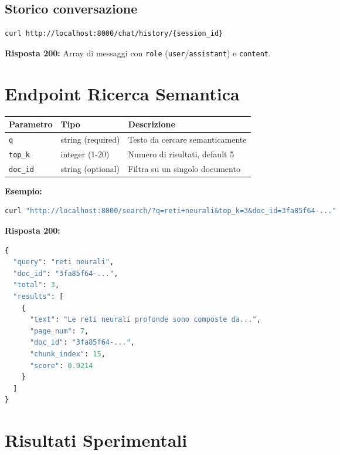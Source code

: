 \subsection{Storico conversazione}

\begin{lstlisting}[language=bash]
curl http://localhost:8000/chat/history/{session_id}
\end{lstlisting}

\textbf{Risposta 200:} Array di messaggi con \texttt{role} (\texttt{user}/\texttt{assistant})
e \texttt{content}.

\section{Endpoint Ricerca Semantica}

\begin{table}[H]
  \centering
  \begin{tabularx}{\textwidth}{llX}
    \toprule
    \textbf{Parametro} & \textbf{Tipo} & \textbf{Descrizione} \\
    \midrule
    \texttt{q}       & string (required) & Testo da cercare semanticamente \\
    \texttt{top\_k}  & integer (1-20)    & Numero di risultati, default 5 \\
    \texttt{doc\_id} & string (optional) & Filtra su un singolo documento \\
    \bottomrule
  \end{tabularx}
\end{table}

\textbf{Esempio:}
\begin{lstlisting}[language=bash]
curl "http://localhost:8000/search/?q=reti+neurali&top_k=3&doc_id=3fa85f64-..."
\end{lstlisting}

\textbf{Risposta 200:}
\begin{lstlisting}[language=Python]
{
  "query": "reti neurali",
  "doc_id": "3fa85f64-...",
  "total": 3,
  "results": [
    {
      "text": "Le reti neurali profonde sono composte da...",
      "page_num": 7,
      "doc_id": "3fa85f64-...",
      "chunk_index": 15,
      "score": 0.9214
    }
  ]
}
\end{lstlisting}

\section{Risultati Sperimentali}

